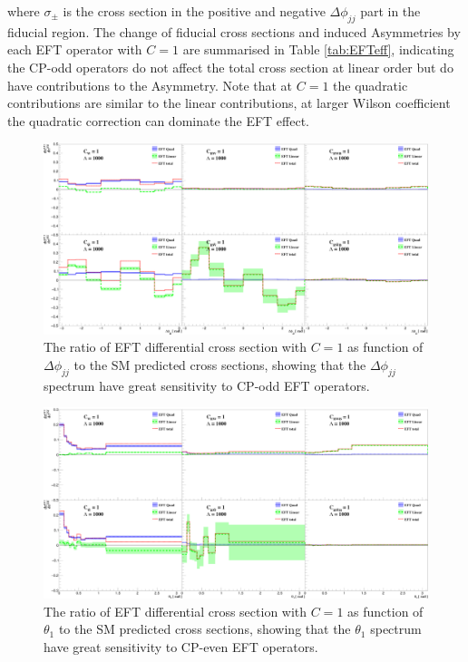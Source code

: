 \documentclass[a4paper,12pt]{article}
\begin{document}
			where $\sigma_{\pm}$ is the cross section in the positive and negative $\Delta\phi_{jj}$ part in the fiducial
			region. The change of fiducial cross sections and induced Asymmetries by each EFT operator with $C=1$ are summarised in Table \ref{tab:EFTeff},
			indicating the CP-odd operators do not affect the total cross section at linear order but do have contributions to the Asymmetry.
			Note that at $C=1$ the quadratic contributions are similar to the linear contributions, at larger Wilson coefficient
			the quadratic correction can dominate the EFT effect.
			\begin{figure}[ht]
				\begin{centering}
				\includegraphics[scale=0.515]{figures/eftoversmphi.png}
				\caption{The ratio of EFT differential cross section with $C=1$ as function of $\Delta\phi_{jj}$ to the SM predicted cross sections, showing that the $\Delta\phi_{jj}$ spectrum have great sensitivity to CP-odd EFT operators.}
				\label{fig:EFToverSMph}
				\end{centering}
			\end{figure}
			\begin{figure}[ht]
				\begin{centering}
				\includegraphics[scale=0.54]{figures/eftoversmthe.png}
				\caption{The ratio of EFT differential cross section with $C=1$ as function of $\theta_1$ to the SM predicted cross sections, showing that the $\theta_1$ spectrum have great sensitivity to CP-even EFT operators.}
				\label{fig:EFToverSMth}
				\end{centering}
			\end{figure}
\end{document}
